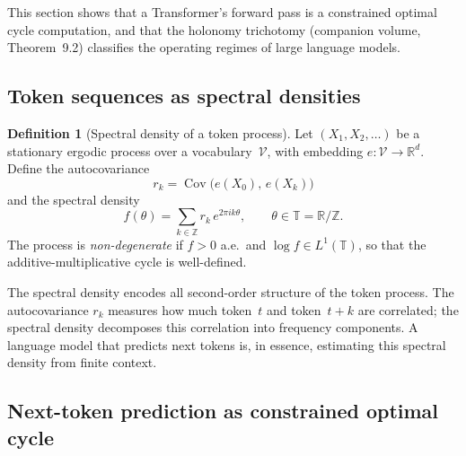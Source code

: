 \documentclass[11pt,a4paper]{article}
\theoremstyle{definition}
\newtheorem{definition}[theorem]{Definition}
\theoremstyle{remark}
\begin{document}
This section shows that a Transformer's forward pass is a
constrained optimal cycle computation, and that the holonomy
trichotomy (companion volume, Theorem~9.2) classifies the
operating regimes of large language models.

\subsection*{Token sequences as spectral densities}

\begin{definition}[Spectral density of a token process]
\label{def:token-spectral}
Let $(X_1, X_2, \ldots)$ be a stationary ergodic process over a
vocabulary~$\mathcal{V}$, with embedding
$e\colon \mathcal{V} \to \mathbb{R}^d$.
Define the autocovariance
\[
  r_k = \operatorname{Cov}\!\bigl(e(X_0),\, e(X_k)\bigr)
\]
and the spectral density
\[
  f(\theta) = \sum_{k \in \mathbb{Z}} r_k\, e^{2\pi i k\theta},
  \qquad \theta \in \mathbb{T} = \mathbb{R}/\mathbb{Z}.
\]
The process is \emph{non-degenerate} if $f > 0$ a.e.\ and
$\log f \in L^1(\mathbb{T})$, so that the additive-multiplicative
cycle is well-defined.
\end{definition}

The spectral density encodes all second-order structure of the
token process.
The autocovariance $r_k$ measures how much token~$t$ and
token~$t+k$ are correlated; the spectral density decomposes
this correlation into frequency components.
A language model that predicts next tokens is, in essence,
estimating this spectral density from finite context.

\subsection*{Next-token prediction as constrained optimal cycle}
\end{document}
